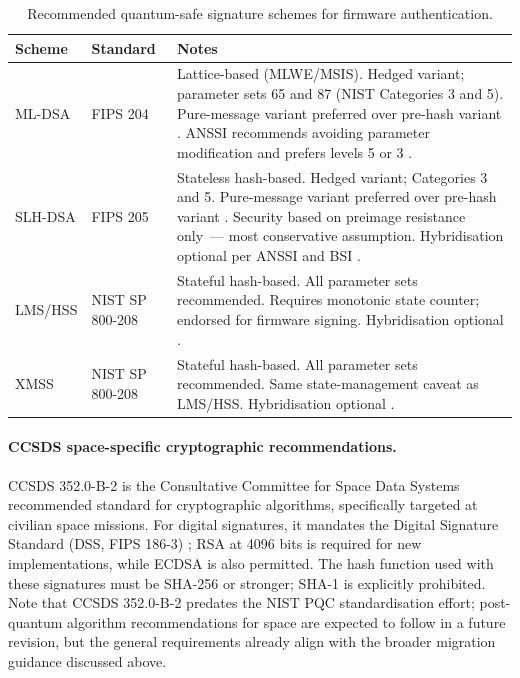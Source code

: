 \begin{table}[h]
    \centering
    \caption{Recommended quantum-safe signature schemes for firmware authentication.}
    \label{tab:pqc-signatures}
    \begin{tabular}{llp{6.5cm}}
        \hline
        \textbf{Scheme} & \textbf{Standard} & \textbf{Notes} \\
        \hline
        ML-DSA  & FIPS 204 \cite{nist_ml_dsa}          & Lattice-based (MLWE/MSIS). Hedged variant; parameter sets 65 and 87 (NIST Categories 3 and 5). Pure-message variant preferred over pre-hash variant \cite{bsi_crypto_key_length}. ANSSI recommends avoiding parameter modification and prefers levels 5 or 3 \cite{anssi_post_quantum_crypto}. \\
        SLH-DSA & FIPS 205 \cite{nist_slh_dsa}          & Stateless hash-based. Hedged variant; Categories 3 and 5. Pure-message variant preferred over pre-hash variant \cite{bsi_crypto_key_length}. Security based on preimage resistance only~--- most conservative assumption. Hybridisation optional per ANSSI and BSI \cite{anssi_post_quantum_crypto, bsi_crypto_key_length}. \\
        LMS/HSS & NIST SP 800-208 \cite{nist_lms_xmss_recc} & Stateful hash-based. All parameter sets recommended. Requires monotonic state counter; endorsed for firmware signing. Hybridisation optional \cite{anssi_post_quantum_crypto}. \\
        XMSS    & NIST SP 800-208 \cite{nist_lms_xmss_recc} & Stateful hash-based. All parameter sets recommended. Same state-management caveat as LMS/HSS. Hybridisation optional \cite{anssi_post_quantum_crypto}. \\
        \hline
    \end{tabular}
\end{table}

\paragraph{CCSDS space-specific cryptographic recommendations.}
CCSDS 352.0-B-2 \cite{ccsds_crypto_algorithms} is the Consultative Committee for Space Data Systems recommended standard for cryptographic algorithms, specifically targeted at civilian space missions. For digital signatures, it mandates the Digital Signature Standard (DSS, FIPS 186-3) \cite{ccsds_crypto_algorithms}; RSA at 4096 bits is required for new implementations, while ECDSA is also permitted. The hash function used with these signatures must be SHA-256 or stronger; SHA-1 is explicitly prohibited. Note that CCSDS 352.0-B-2 predates the NIST PQC standardisation effort; post-quantum algorithm recommendations for space are expected to follow in a future revision, but the general requirements already align with the broader migration guidance discussed above.

